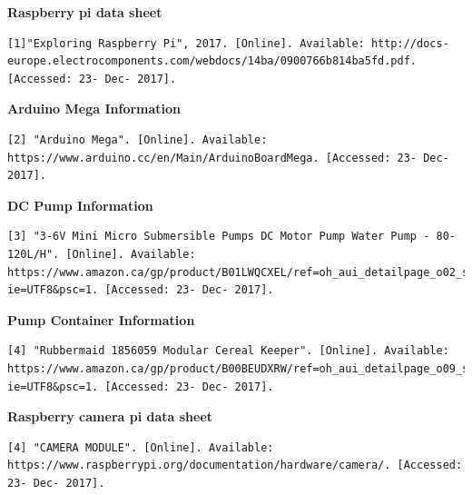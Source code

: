 \documentclass [10pt]{article}
\begin{document}
\textbf{Raspberry pi data sheet}
\begin{verbatim}
[1]"Exploring Raspberry Pi", 2017. [Online]. Available: http://docs-europe.electrocomponents.com/webdocs/14ba/0900766b814ba5fd.pdf. [Accessed: 23- Dec- 2017].
\end{verbatim}
\textbf{Arduino Mega Information}
\begin{verbatim}
[2] "Arduino Mega". [Online]. Available:
https://www.arduino.cc/en/Main/ArduinoBoardMega. [Accessed: 23- Dec- 2017].
\end{verbatim}
\textbf{DC Pump Information}
\begin{verbatim}
[3] "3-6V Mini Micro Submersible Pumps DC Motor Pump Water Pump - 80-120L/H". [Online]. Available:
https://www.amazon.ca/gp/product/B01LWQCXEL/ref=oh_aui_detailpage_o02_s00?ie=UTF8&psc=1. [Accessed: 23- Dec- 2017].
\end{verbatim}
\textbf{Pump Container Information}
\begin{verbatim}
[4] "Rubbermaid 1856059 Modular Cereal Keeper". [Online]. Available: https://www.amazon.ca/gp/product/B00BEUDXRW/ref=oh_aui_detailpage_o09_s00?ie=UTF8&psc=1. [Accessed: 23- Dec- 2017].
\end{verbatim}

\textbf{Raspberry camera pi data sheet}
\begin{verbatim}
[4] "CAMERA MODULE". [Online]. Available:
https://www.raspberrypi.org/documentation/hardware/camera/. [Accessed: 23- Dec- 2017].
\end{verbatim}
\end{document}
